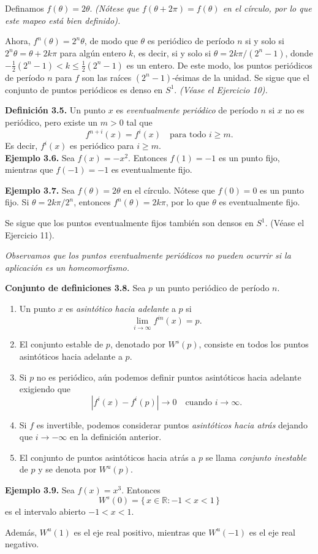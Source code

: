 \documentclass[10pt,a4paper]{article}
\begin{document}
Definamos $f(\theta)=2\theta$. \textit{(Nótese que $f(\theta + 2\pi) = f(\theta)$ en el círculo, por lo que este mapeo está bien definido).  }

Ahora, $f^{n}(\theta) = 2^{n}\theta$, de modo que $\theta$ es periódico de período $n$ si y solo si $2^{n}\theta = \theta + 2k\pi$ para algún entero $k$, es decir, si y solo si $\theta = 2k\pi/(2^{n}-1)$, donde $- \frac{1}{2}(2^{n}-1) < k \le \frac{1}{2}(2^{n}-1)$ es un entero. De este modo, los puntos periódicos de período $n$ para $f$ son las raíces $(2^{n}-1)$-ésimas de la unidad. Se sigue que el conjunto de puntos periódicos es denso en $S^{1}$. \textit{(Véase el Ejercicio 10).}


\newpage

\textbf{Definición 3.5.} Un punto $x$ es \emph{eventualmente periódico} de período $n$ si $x$ no es periódico, 
pero existe un $m>0$ tal que 
\[
f^{n+i}(x) = f^{i}(x) \quad \text{para todo } i \geq m.
\]
Es decir, $f^{i}(x)$ es periódico para $i \geq m$.
\\

\textbf{Ejemplo 3.6.} Sea $f(x) = -x^{2}$. Entonces $f(1) = -1$ es un punto fijo, mientras que 
$f(-1) = -1$ es eventualmente fijo.

\medskip

\textbf{Ejemplo 3.7.} Sea $f(\theta) = 2\theta$ en el círculo.  
Nótese que $f(0)=0$ es un punto fijo.  
Si $\theta = 2k\pi/2^{n}$, entonces $f^{n}(\theta) = 2k\pi$, por lo que $\theta$ es eventualmente fijo.  

Se sigue que los puntos eventualmente fijos también son densos en $S^{1}$.  
(Véase el Ejercicio 11).

\medskip

\textit{Observamos que los puntos eventualmente periódicos no pueden ocurrir si la aplicación es un homeomorfismo.}

\newpage

\textbf{Conjunto de definiciones 3.8.} Sea $p$ un punto periódico de período $n$. 
\begin{enumerate}
	\item Un punto $x$ es \emph{asintótico hacia adelante} a $p$ si 
\[
\lim_{i \to \infty} f^{in}(x) = p.
\]
	\item El conjunto estable de $p$, denotado por $W^{s}(p)$, consiste en todos los puntos asintóticos hacia adelante a $p$.
	\item Si $p$ no es periódico, aún podemos definir puntos asintóticos hacia adelante exigiendo que 
\[
|f^{i}(x) - f^{i}(p)| \to 0 \quad \text{cuando } i \to \infty.
\]
	\item Si $f$ es invertible, podemos considerar puntos \emph{asintóticos hacia atrás} dejando que $i \to -\infty$ en la definición anterior. 
	
	\item El conjunto de puntos asintóticos hacia atrás a $p$ se llama \emph{conjunto inestable} de $p$ y se denota por $W^{u}(p)$.
\end{enumerate}

\textbf{Ejemplo 3.9.} Sea $f(x) = x^{3}$. Entonces 
\[
W^{s}(0) = \{\, x \in \mathbb{R} : -1 < x < 1 \,\}
\]
es el intervalo abierto $-1 < x < 1$.  

Además, $W^{u}(1)$ es el eje real positivo, mientras que $W^{u}(-1)$ es el eje real negativo.
\end{document}
